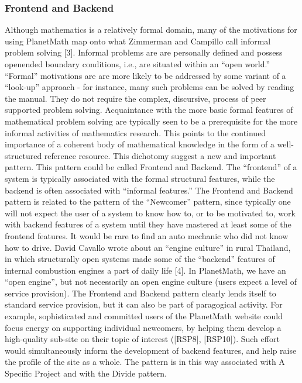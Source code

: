 \subsubsection{Frontend and Backend}

Although mathematics is a relatively formal domain, many of the
motivations for using PlanetMath map onto what Zimmerman and Campillo
call informal problem solving {[}3{]}. Informal problems are are
personally defined and possess openended boundary conditions, i.e., are
situated within an ``open world.'' ``Formal'' motivations are are more
likely to be addressed by some variant of a ``look-up'' approach - for
instance, many such problems can be solved by reading the manual. They
do not require the complex, discursive, process of peer supported
problem solving. Acquaintance with the more basic formal features of
mathematical problem solving are typically seen to be a prerequisite for
the more informal activities of mathematics research. This points to the
continued importance of a coherent body of mathematical knowledge in the
form of a well-structured reference resource. This dichotomy suggest a
new and important pattern. This pattern could be called Frontend and
Backend. The ``frontend'' of a system is typically associated with the
formal structural features, while the backend is often associated with
``informal features.'' The Frontend and Backend pattern is related to
the pattern of the ``Newcomer'' pattern, since typically one will not
expect the user of a system to know how to, or to be motivated to, work
with backend features of a system until they have mastered at least some
of the frontend features. It would be rare to find an auto mechanic who
did not know how to drive. David Cavallo wrote about an ``engine
culture'' in rural Thailand, in which structurally open systems made
some of the ``backend'' features of internal combustion engines a part
of daily life {[}4{]}. In PlanetMath, we have an ``open engine'', but
not necessarily an open engine culture (users expect a level of service
provision). The Frontend and Backend pattern clearly lends itself to
standard service provision, but it can also be part of paragogical
activity. For example, sophisticated and committed users of the
PlanetMath website could focus energy on supporting individual
newcomers, by helping them develop a high-quality sub-site on their
topic of interest ({[}RSP8{]}, {[}RSP10{]}). Such effort would
simultaneously inform the development of backend features, and help
raise the profile of the site as a whole. The pattern is in this way
associated with A Specific Project and with the Divide pattern.

